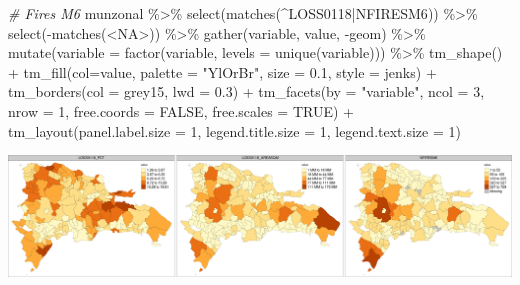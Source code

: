 \documentclass[10pt,landscape,a3paper]{article}
\newenvironment{Shaded}{\begin{snugshade}}{\end{snugshade}}
\newcommand{\AttributeTok}[1]{\textcolor[rgb]{0.77,0.63,0.00}{#1}}
\newcommand{\CommentTok}[1]{\textcolor[rgb]{0.56,0.35,0.01}{\textit{#1}}}
\newcommand{\ConstantTok}[1]{\textcolor[rgb]{0.00,0.00,0.00}{#1}}
\newcommand{\DecValTok}[1]{\textcolor[rgb]{0.00,0.00,0.81}{#1}}
\newcommand{\FloatTok}[1]{\textcolor[rgb]{0.00,0.00,0.81}{#1}}
\newcommand{\FunctionTok}[1]{\textcolor[rgb]{0.00,0.00,0.00}{#1}}
\newcommand{\NormalTok}[1]{#1}
\newcommand{\SpecialCharTok}[1]{\textcolor[rgb]{0.00,0.00,0.00}{#1}}
\newcommand{\StringTok}[1]{\textcolor[rgb]{0.31,0.60,0.02}{#1}}
\begin{document}
\begin{Shaded}
\begin{Highlighting}[]

\CommentTok{\# Fires M6}
\NormalTok{munzonal }\SpecialCharTok{\%\textgreater{}\%} \FunctionTok{select}\NormalTok{(}\FunctionTok{matches}\NormalTok{(}\StringTok{\textquotesingle{}\^{}LOSS0118|NFIRESM6\textquotesingle{}}\NormalTok{)) }\SpecialCharTok{\%\textgreater{}\%} \FunctionTok{select}\NormalTok{(}\SpecialCharTok{{-}}\FunctionTok{matches}\NormalTok{(}\StringTok{\textquotesingle{}\textless{}NA\textgreater{}\textquotesingle{}}\NormalTok{)) }\SpecialCharTok{\%\textgreater{}\%} 
  \FunctionTok{gather}\NormalTok{(variable, value, }\SpecialCharTok{{-}}\NormalTok{geom) }\SpecialCharTok{\%\textgreater{}\%}
  \FunctionTok{mutate}\NormalTok{(}\AttributeTok{variable =} \FunctionTok{factor}\NormalTok{(variable, }\AttributeTok{levels =} \FunctionTok{unique}\NormalTok{(variable))) }\SpecialCharTok{\%\textgreater{}\%} 
  \FunctionTok{tm\_shape}\NormalTok{() }\SpecialCharTok{+}
  \FunctionTok{tm\_fill}\NormalTok{(}\AttributeTok{col=}\StringTok{\textquotesingle{}value\textquotesingle{}}\NormalTok{, }\AttributeTok{palette =} \StringTok{"YlOrBr"}\NormalTok{, }\AttributeTok{size =} \FloatTok{0.1}\NormalTok{, }\AttributeTok{style =} \StringTok{\textquotesingle{}jenks\textquotesingle{}}\NormalTok{) }\SpecialCharTok{+}
  \FunctionTok{tm\_borders}\NormalTok{(}\AttributeTok{col =} \StringTok{\textquotesingle{}grey15\textquotesingle{}}\NormalTok{, }\AttributeTok{lwd =} \FloatTok{0.3}\NormalTok{) }\SpecialCharTok{+}
  \FunctionTok{tm\_facets}\NormalTok{(}\AttributeTok{by =} \StringTok{"variable"}\NormalTok{, }\AttributeTok{ncol =} \DecValTok{3}\NormalTok{, }\AttributeTok{nrow =} \DecValTok{1}\NormalTok{, }\AttributeTok{free.coords =} \ConstantTok{FALSE}\NormalTok{, }\AttributeTok{free.scales =} \ConstantTok{TRUE}\NormalTok{) }\SpecialCharTok{+}
  \FunctionTok{tm\_layout}\NormalTok{(}\AttributeTok{panel.label.size =} \DecValTok{1}\NormalTok{, }\AttributeTok{legend.title.size =} \DecValTok{1}\NormalTok{, }\AttributeTok{legend.text.size =} \DecValTok{1}\NormalTok{)}
\end{Highlighting}
\end{Shaded}

\begin{center}\includegraphics{img/data-download-preparation-eda/zonal-mun-6} \end{center}
\end{document}
